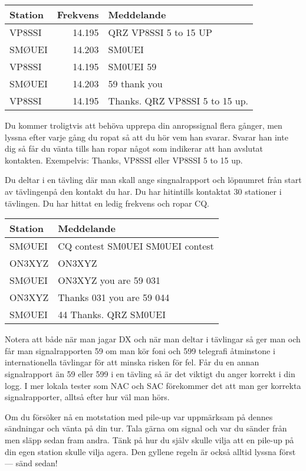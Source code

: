\begin{tabular}{lrl}
	Station & Frekvens & Meddelande                     \\ \hline
	VP8SSI  &   14.195 & QRZ VP8SSI  5 to 15 UP         \\
	SMØUEI  &   14.203 & SM0UEI                         \\
	VP8SSI  &   14.195 & SM0UEI 59                      \\
	SMØUEI  &   14.203 & 59 thank you                   \\
	VP8SSI  &   14.195 & Thanks. QRZ VP8SSI 5 to 15 up.
\end{tabular}

Du kommer troligtvis att behöva upprepa din anropssignal flera gånger, men
lyssna efter varje gång du ropat så att du hör vem han svarar. Svarar han inte
dig så får du vänta tills han ropar något som indikerar att han avslutat
kontakten. Exempelvis: Thanks, VP8SSI eller VP8SSI 5 to 15 up.

Du deltar i en tävling där man skall ange singnalrapport och löpnumret från
start av tävlingenpå den kontakt du har. Du har hitintills kontaktat 30
stationer i tävlingen. Du har hittat en ledig frekvens och ropar CQ.

\begin{tabular}{ll}
	Station & Meddelande                       \\ \hline
	SMØUEI  & CQ contest SM0UEI SM0UEI contest \\
	ON3XYZ  & ON3XYZ                           \\
	SMØUEI  & ON3XYZ you are 59 031            \\
	ON3XYZ  & Thanks 031 you are 59 044        \\
	SMØUEI  & 44 Thanks. QRZ SM0UEI
\end{tabular}

Notera att både när man jagar DX och när man deltar i tävlingar så ger man och
får man signalrapporten 59 om man kör foni och 599 telegrafi åtminstone i
internationella tävlingar för att minska risken för fel. Får du en annan
signalrapport än 59 eller 599 i en tävling så är det viktigt du anger korrekt i
din logg. I mer lokala tester som NAC och SAC förekommer det att man ger
korrekta signalrapporter, alltså efter hur väl man hörs.

Om du försöker nå en motstation med pile-up var uppmärksam på dennes sändningar
och vänta på din tur. Tala gärna om signal och var du sänder från men släpp
sedan fram andra. Tänk på hur du själv skulle vilja att en pile-up på din egen
station skulle vilja agera. Den gyllene regeln är också alltid lyssna först ---
sänd sedan!

